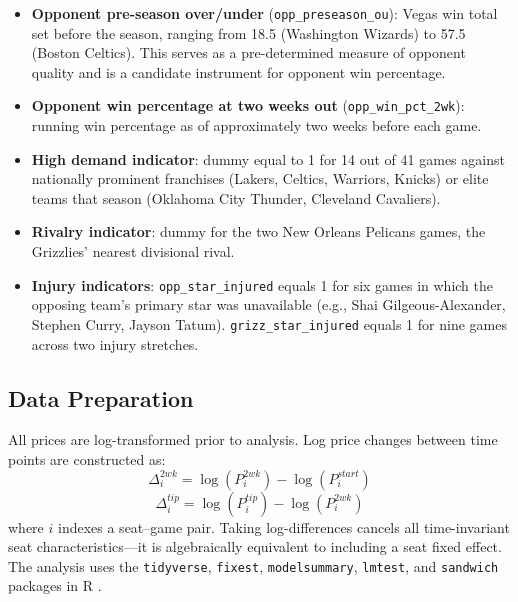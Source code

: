 \documentclass[12pt]{article}
\begin{document}
\begin{itemize}
    \item \textbf{Opponent pre-season over/under} (\texttt{opp\_preseason\_ou}): Vegas win total set before the season, ranging from 18.5 (Washington Wizards) to 57.5 (Boston Celtics). This serves as a pre-determined measure of opponent quality and is a candidate instrument for opponent win percentage.
    \item \textbf{Opponent win percentage at two weeks out} (\texttt{opp\_win\_pct\_2wk}): running win percentage as of approximately two weeks before each game.
    \item \textbf{High demand indicator}: dummy equal to 1 for 14 out of 41 games against nationally prominent franchises (Lakers, Celtics, Warriors, Knicks) or elite teams that season (Oklahoma City Thunder, Cleveland Cavaliers).
    \item \textbf{Rivalry indicator}: dummy for the two New Orleans Pelicans games, the Grizzlies' nearest divisional rival.
    \item \textbf{Injury indicators}: \texttt{opp\_star\_injured} equals 1 for six games in which the opposing team's primary star was unavailable (e.g., Shai Gilgeous-Alexander, Stephen Curry, Jayson Tatum). \texttt{grizz\_star\_injured} equals 1 for nine games across two injury stretches.
\end{itemize}
 
\subsection{Data Preparation}
 
All prices are log-transformed prior to analysis. Log price changes between time points are constructed as:
\begin{equation}
    \Delta^{2wk}_i = \log(P^{2wk}_i) - \log(P^{start}_i)
    \label{eq:delta2wk}
\end{equation}
\begin{equation}
    \Delta^{tip}_i = \log(P^{tip}_i) - \log(P^{2wk}_i)
    \label{eq:deltatip}
\end{equation}
where $i$ indexes a seat--game pair. Taking log-differences cancels all time-invariant seat characteristics---it is algebraically equivalent to including a seat fixed effect. The analysis uses the \texttt{tidyverse}, \texttt{fixest}, \texttt{modelsummary}, \texttt{lmtest}, and \texttt{sandwich} packages in R \citep{r2024, berge2018fixest, arel2022modelsummary}.
 
 
\end{document}
